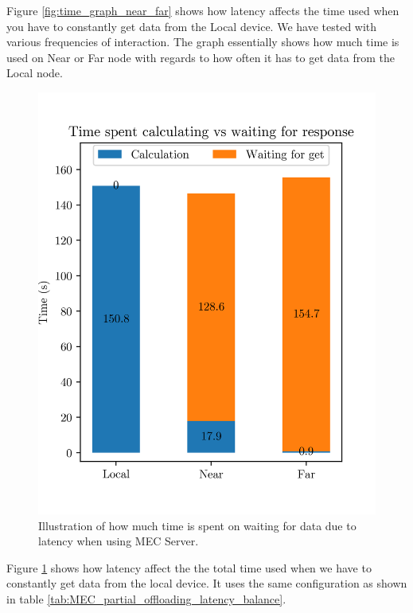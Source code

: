 Figure \ref{fig:time_graph_near_far} shows how latency affects the time used when you have to constantly get data from the Local device. We have tested with various frequencies of interaction. The graph essentially shows how much time is used on Near or Far node with regards to how often it has to get data from the Local node. 
\begin{figure}[t]
    \centering
    \includegraphics[scale=1]{chapters/evaluation/figures/bar_local_near_far_compare.png}
    \caption{Illustration of how much time is spent on waiting for data due to latency when using MEC Server.}
    \label{fig:bar_local_near_far}
\end{figure}

Figure \ref{fig:bar_local_near_far} shows how latency affect the the total time used when we have to constantly get data from the local device. It uses the same configuration as shown in table \ref{tab:MEC_partial_offloading_latency_balance}.


